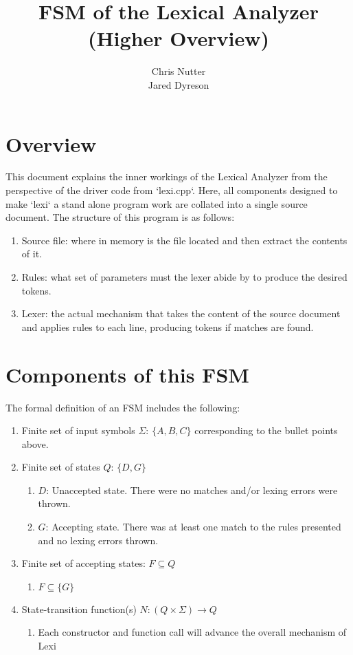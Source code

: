 \documentclass{article}
\title{FSM of the Lexical Analyzer (Higher Overview)}
\author{Chris Nutter \\
        Jared Dyreson}
\begin{document}
\maketitle
\tableofcontents

\newpage

\section{Overview}

This document explains the inner workings of the Lexical Analyzer from the perspective of the driver code from `lexi.cpp`.
Here, all components designed to make `lexi` a stand alone program work are collated into a single source document.
The structure of this program is as follows:

\begin{enumerate}
\item Source file: where in memory is the file located and then extract the contents of it.
\item Rules: what set of parameters must the lexer abide by to produce the desired tokens.
\item Lexer: the actual mechanism that takes the content of the source document and applies rules to each line, producing tokens if matches are found.
\end{enumerate}

\section{Components of this FSM}

The formal definition of an FSM includes the following:

\begin{enumerate}
\item Finite set of input symbols $\Sigma$: $\{A, B, C\}$ corresponding to the bullet points above.
\item Finite set of states $Q$: $\{D, G\}$
\begin{enumerate}
\item $D$: Unaccepted state. There were no matches and/or lexing errors were thrown.
\item $G$: Accepting state. There was at least one match to the rules presented and no lexing errors thrown.
\end{enumerate}
\item Finite set of accepting states: $F \subseteq Q$
\begin{enumerate}
\item $F \subseteq \{G\}$
\end{enumerate}
\item State-transition function(s) $N: (Q \times \Sigma) \rightarrow Q$
\begin{enumerate}
\item Each constructor and function call will advance the overall mechanism of Lexi
\end{enumerate}
\end{enumerate}
\end{document}
